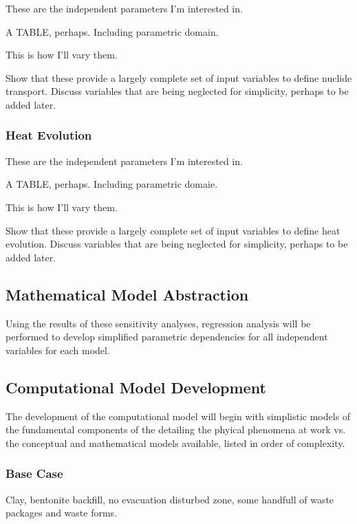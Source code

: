 These are the independent parameters I'm interested in.

A TABLE, perhaps. Including parametric domain.

This is how I'll vary them.

Show that these provide a largely complete set of input variables to define 
nuclide transport. Discuss variables that are being neglected for simplicity, 
perhaps to be added later. 

\subsubsection{Heat Evolution}

These are the independent parameters I'm interested in.

A TABLE, perhaps. Including parametric domaie.

This is how I'll vary them.

Show that these provide a largely complete set of input variables to define heat 
evolution. Discuss variables that are being neglected for simplicity, perhaps to 
be added later. 

\subsection{Mathematical Model Abstraction}

Using the results of these sensitivity analyses, regression analysis will be 
performed to develop simplified parametric dependencies for all independent 
variables for each model. 

\subsection{Computational Model Development}

The development of the computational model will begin with simplistic models of  
the fundamental components of the detailing the phyical phenomena at work vs.  
the conceptual and mathematical models available, listed in order of complexity.


\subsubsection{Base Case}

Clay, bentonite backfill, no evacuation disturbed zone, some handfull of waste 
packages and waste forms.




